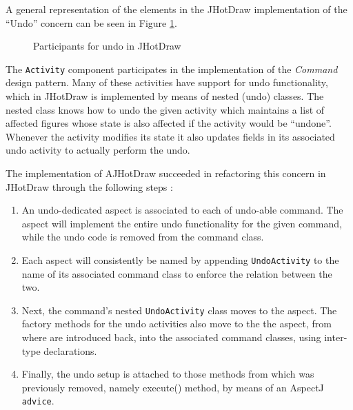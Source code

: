 A general representation of the elements in the JHotDraw implementation of the ``Undo'' concern can be seen in Figure \ref{fig:Participants_for_undo_in_JHotDraw}.

\begin{figure}[H]
	\centering
  	\caption{Participants for undo in JHotDraw \cite{marin2004refactoring}}
  	\label{fig:Participants_for_undo_in_JHotDraw}
\end{figure}

The \texttt{Activity} component participates in the implementation of the \textit{Command} design pattern\cite{gamma1995design}. 
Many of these activities have support for undo functionality, which in JHotDraw is implemented by means of nested (undo) classes.
The nested class knows how to undo the given activity which maintains a list of affected figures whose state is also affected if the activity would be ``undone''. 
Whenever the activity modifies its state it also updates fields in its associated undo activity to actually perform the undo. 

The implementation of AJHotDraw succeeded in refactoring this concern in JHotDraw through the following steps \cite{marin2004refactoring}:

\begin{enumerate}

	\item An undo-dedicated aspect is associated to each of undo-able command. 
	The aspect will implement the entire undo functionality for the given command, while the undo code is removed from the command class.

 	\item Each aspect will consistently be named by appending \texttt{UndoActivity} to the name of its associated command class to enforce the relation between the two.

	\item Next, the command's nested \texttt{UndoActivity} class moves to the aspect. 
	The factory methods for the undo activities also move to the the aspect, from where are introduced back, into the associated command classes, using inter-type declarations.

	\item Finally, the undo setup is attached to those methods from which was previously removed, namely execute() method, by means of an AspectJ \texttt{advice}.

\end{enumerate}

